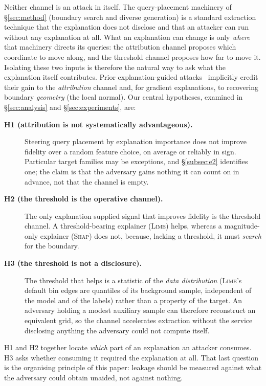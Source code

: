 \documentclass[sigconf,anonymous,review]{acmart}
\begin{document}
Neither channel is an attack in itself. The query-placement machinery of \S\ref{sec:method} (boundary search and diverse generation) is a standard extraction technique that the explanation does not
disclose and that an attacker can run without any explanation at all. What an explanation can change is
only \emph{where} that machinery directs its queries: the attribution channel proposes which coordinate
to move along, and the threshold channel proposes how far to move it. Isolating these two inputs is
therefore the natural way to ask what the explanation itself contributes. Prior explanation-guided
attacks~\cite{oksuz2024autolycus,milli2019model} implicitly credit their gain to the
\emph{attribution} channel and, for gradient explanations, to recovering boundary \emph{geometry} (the
local normal). Our central hypotheses, examined
in \S\ref{sec:analysis} and \S\ref{sec:experiments}, are:
\begin{description}
  \item[\textbf{H1 (attribution is not systematically advantageous).}] Steering query placement by
  explanation importance does not improve fidelity over a random feature choice, on average or
  reliably in sign. Particular target families may be exceptions, and \S\ref{subsec:e2} identifies
  one; the claim is that the adversary gains nothing it can count on in advance, not that the channel
  is empty.
  \item[\textbf{H2 (the threshold is the operative channel).}] The only explanation supplied
  signal that improves fidelity is the threshold channel. A threshold-bearing explainer
  (\textsc{Lime}) helps, whereas a magnitude-only explainer (\textsc{Shap}) does not, because, lacking a threshold, it must \emph{search} for the boundary.
  \item[\textbf{H3 (the threshold is not a disclosure).}] The threshold that helps is a
  statistic of the \emph{data distribution} (\textsc{Lime}'s default bin edges are quantiles of its background sample, independent of the model and of the labels) rather than a
  property of the target. An adversary holding a modest auxiliary sample can therefore
  reconstruct an equivalent grid, so the channel accelerates extraction without the service
  disclosing anything the adversary could not compute itself.
\end{description}
H1 and H2 together locate \emph{which} part of an explanation an attacker consumes. H3 asks whether consuming it required the explanation at all. That last question is the organising
principle of this paper: leakage should be measured against what the adversary could obtain
unaided, not against nothing.
\end{document}
